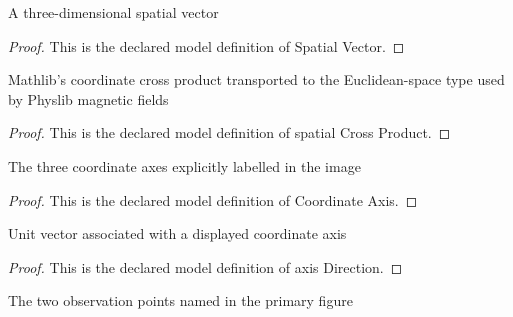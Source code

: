 \begin{definition}
  \label{def:physics:phyx-mini-0916:phyxminiproblems-problemphyxmini0916-spatialvector}
  A three-dimensional spatial vector
\end{definition}
\begin{proof}
  This is the declared model definition of Spatial Vector.
\end{proof}
\begin{definition}
  \label{def:physics:phyx-mini-0916:phyxminiproblems-problemphyxmini0916-spatialcrossproduct}
  Mathlib's coordinate cross product transported to the Euclidean-space type used by Physlib magnetic fields
\end{definition}
\begin{proof}
  This is the declared model definition of spatial Cross Product.
\end{proof}
\begin{definition}
  \label{def:physics:phyx-mini-0916:phyxminiproblems-problemphyxmini0916-coordinateaxis}
  The three coordinate axes explicitly labelled in the image
\end{definition}
\begin{proof}
  This is the declared model definition of Coordinate Axis.
\end{proof}
\begin{definition}
  \label{def:physics:phyx-mini-0916:phyxminiproblems-problemphyxmini0916-axisdirection}
  Unit vector associated with a displayed coordinate axis
\end{definition}
\begin{proof}
  This is the declared model definition of axis Direction.
\end{proof}
\begin{definition}
  \label{def:physics:phyx-mini-0916:phyxminiproblems-problemphyxmini0916-observationpoint}
  The two observation points named in the primary figure
\end{definition}
